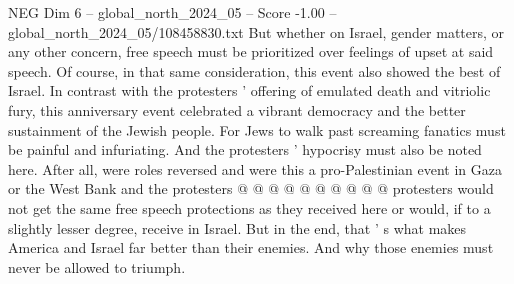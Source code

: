 \begin{textsample}{NEG Dim 6 – global\_north\_2024\_05 – Score -1.00 – global\_north\_2024\_05/108458830.txt}
But whether on Israel, gender matters, or any other concern, free speech must be prioritized over feelings of upset at said speech.
Of course, in that same consideration, this event also showed the best of Israel.
In contrast with the protesters ' offering of emulated death and vitriolic fury, this anniversary event celebrated a vibrant democracy and the better sustainment of the Jewish people.
For Jews to walk past screaming fanatics must be painful and infuriating.
And the protesters ' hypocrisy must also be noted here.
After all, were roles reversed and were this a pro-Palestinian event in Gaza or the West Bank and the protesters @ @ @ @ @ @ @ @ @ @ protesters would not get the same free speech protections as they received here or would, if to a slightly lesser degree, receive in Israel.
But in the end, that ' s what makes America and Israel far better than their enemies.
And why those enemies must never be allowed to triumph.

\end{textsample}
